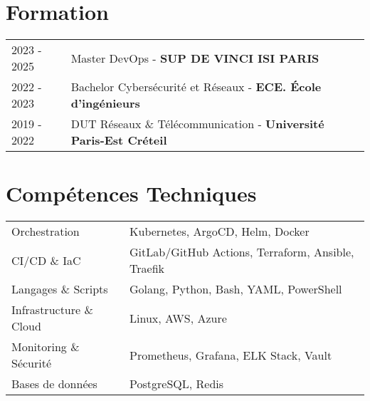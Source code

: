 \documentclass[a4paper,11pt]{article}
\begin{document}
\section{Formation}
\begin{tabularx}{\linewidth}{@{}l X@{}}	
2023 - 2025 & Master DevOps - \textbf{SUP DE VINCI ISI PARIS} \\
2022 - 2023 & Bachelor Cybersécurité et Réseaux - \textbf{ECE. École d'ingénieurs} \\
2019 - 2022 & DUT Réseaux \& Télécommunication - \textbf{Université Paris-Est Créteil} \\
\end{tabularx}

\section{Compétences Techniques}
\begin{tabularx}{\linewidth}{@{}l X@{}}
Orchestration & \normalsize{Kubernetes, ArgoCD, Helm, Docker}\\
CI/CD \& IaC & \normalsize{GitLab/GitHub Actions, Terraform, Ansible, Traefik}\\
Langages \& Scripts & \normalsize{Golang, Python, Bash, YAML, PowerShell}\\
Infrastructure \& Cloud & \normalsize{Linux, AWS, Azure}\\
Monitoring \& Sécurité & \normalsize{Prometheus, Grafana, ELK Stack, Vault}\\
Bases de données & \normalsize{PostgreSQL, Redis}\\
\end{tabularx}
\end{document}
